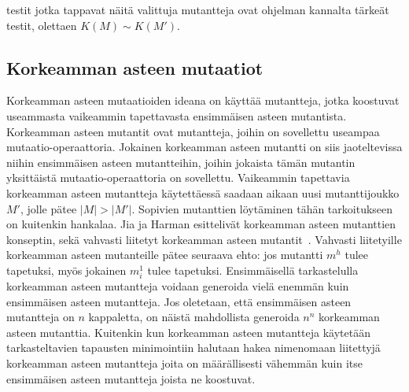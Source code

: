 \documentclass{tktltiki}
\begin{document}
testit jotka tappavat näitä valittuja mutantteja ovat ohjelman kannalta tärkeät testit, olettaen $K(M) \sim K(M')$.

\subsection{Korkeamman asteen mutaatiot}
Korkeamman asteen mutaatioiden ideana on käyttää mutantteja, jotka koostuvat useammasta vaikeammin tapettavasta ensimmäisen asteen mutantista. Korkeamman asteen mutantit ovat mutantteja, joihin on sovellettu useampaa mutaatio-operaattoria. Jokainen korkeamman asteen mutantti on siis jaoteltevissa niihin ensimmäisen asteen mutantteihin, joihin jokaista tämän mutantin yksittäistä mutaatio-operaattoria on sovellettu. Vaikeammin tapettavia korkeamman asteen mutantteja käytettäessä saadaan aikaan uusi mutanttijoukko $M'$, jolle pätee $|M| > |M'|$. Sopivien mutanttien löytäminen tähän tarkoitukseen on kuitenkin hankalaa. Jia ja Harman esittelivät korkeamman asteen mutanttien konseptin, sekä vahvasti liitetyt korkeamman asteen mutantit~\cite{JiaH08b}. Vahvasti liitetyille korkeamman asteen mutanteille pätee seuraava ehto: jos mutantti $m^h$ tulee tapetuksi, myös jokainen $m^1_i$ tulee tapetuksi. Ensimmäisellä tarkastelulla korkeamman asteen mutantteja voidaan generoida vielä enemmän kuin ensimmäisen asteen mutantteja. Jos oletetaan, että ensimmäisen asteen mutantteja on $n$ kappaletta, on näistä mahdollista generoida $n^n$ korkeamman asteen mutanttia. Kuitenkin kun korkeamman asteen mutantteja käytetään tarkasteltavien tapausten minimointiin halutaan hakea nimenomaan liitettyjä korkeamman asteen mutantteja joita on määrällisesti vähemmän kuin itse ensimmäisen asteen mutantteja joista ne koostuvat. 
\end{document}

